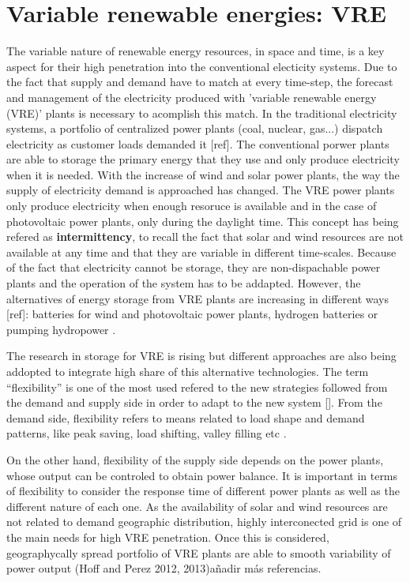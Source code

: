 \section{Variable renewable energies: VRE}

The variable nature of renewable energy resources, in space and time, is a key aspect for their high penetration into the conventional electicity systems. Due to the fact that supply and demand have to match at every time-step, the forecast and management of the electricity produced with 'variable renewable energy (VRE)' plants is necessary to acomplish this match. In the traditional electricity systems, a portfolio of centralized power plants (coal, nuclear, gas...) dispatch electricity as customer loads demanded it [ref]. The conventional porwer plants are able to storage the primary energy that they use and only produce electricity when it is needed. With the increase of wind and solar power plants, the way the supply of electricity demand is approached has changed. The VRE power plants only produce electricity when enough resoruce is available and in the case of photovoltaic power plants, only during the daylight time. This concept has being refered as \textbf{intermittency}, to recall the fact that solar and wind resources are not available at any time and that they are variable in different time-scales. Because of the fact that electricity cannot be storage, they are non-dispachable power plants and the operation of the system has to be addapted. However, the alternatives of energy storage from VRE plants are increasing in different ways [ref]: batteries for wind and photovoltaic power plants, hydrogen batteries or pumping hydropower \cite*{Lund2015}.

The research in storage for VRE is rising but different approaches are also being addopted to integrate high share of this alternative technologies. The term ``flexibility'' is one of the most used refered to the new strategies followed from the demand and supply side in order to adapt to the new system []. From the demand side, flexibility refers to means related to load shape and demand patterns, like peak saving, load shifting, valley filling etc \cite*{Lund2015}.

On the other hand, flexibility of the supply side depends on the power plants, whose output can be controled to obtain power balance. It is important in terms of flexibility to consider the response time of different power plants as well as the different nature of each one. As the availability of solar and wind resources are not related to demand geographic distribution, highly interconected grid is one of the main needs for high VRE penetration. Once this is considered, geographycally spread portfolio of VRE plants are able to smooth variability of power output \cite*{KROPOSKI2017, Marcos2012}(Hoff and Perez 2012, 2013){añadir más referencias}.

